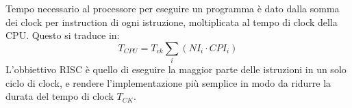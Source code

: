 \documentclass[../ace.tex]{subfiles}
\begin{document}
Tempo necessario al processore per eseguire un programma è dato dalla somma
dei clock per instruction di ogni istruzione, moltiplicata al tempo di clock della CPU.
Questo si traduce in:
\[
    T_{\mathit{CPU}} = T_{\mathit{ck}}\sum_i (\mathit{NI}_i \cdot \mathit{CPI}_i)
\]
L'obbiettivo RISC è quello di eseguire la maggior parte delle istruzioni in un solo ciclo di clock,
e rendere l'implementazione più semplice in modo da ridurre la durata del tempo di clock $T_\mathit{CK}$.
\end{document}
